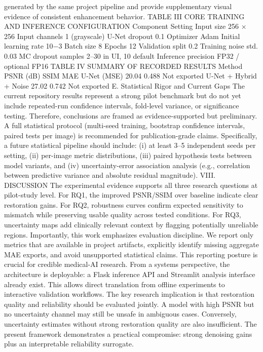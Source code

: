 generated by the same project pipeline and provide supplementary visual evidence of consistent enhancement behavior.
TABLE III
CORE TRAINING AND INFERENCE CONFIGURATION
Component Setting
Input size 256 × 256
Input channels 1 (grayscale)
U-Net dropout 0.1
Optimizer Adam
Initial learning rate 10−3
Batch size 8
Epochs 12
Validation split 0.2
Training noise std. 0.03
MC dropout samples 2–30 in UI, 10 default
Inference precision FP32 / optional FP16
TABLE IV
SUMMARY OF RECORDED RESULTS
Method PSNR (dB) SSIM MAE
U-Net (MSE) 20.04 0.488 Not exported
U-Net + Hybrid + Noise 27.02 0.742 Not exported
E. Statistical Rigor and Current Gaps
The current repository results represent a strong pilot benchmark but do not yet include repeated-run confidence intervals,
fold-level variance, or significance testing. Therefore, conclusions are framed as evidence-supported but preliminary. A
full statistical protocol (multi-seed training, bootstrap confidence intervals, paired tests per image) is recommended for
publication-grade claims.
Specifically, a future statistical pipeline should include: (i)
at least 3–5 independent seeds per setting, (ii) per-image metric distributions, (iii) paired hypothesis tests between model
variants, and (iv) uncertainty-error association analysis (e.g.,
correlation between predictive variance and absolute residual
magnitude).
VIII. DISCUSSION
The experimental evidence supports all three research questions at pilot-study level. For RQ1, the improved PSNR/SSIM
over baseline indicate clear restoration gains. For RQ2, robustness curves confirm expected sensitivity to mismatch while
preserving usable quality across tested conditions. For RQ3,
uncertainty maps add clinically relevant context by flagging
potentially unreliable regions.
Importantly, this work emphasizes evaluation discipline.
We report only metrics that are available in project artifacts,
explicitly identify missing aggregate MAE exports, and avoid
unsupported statistical claims. This reporting posture is crucial
for credible medical-AI research.
From a systems perspective, the architecture is deployable:
a Flask inference API and Streamlit analysis interface already
exist. This allows direct translation from offline experiments
to interactive validation workflows.
The key research implication is that restoration quality and
reliability should be evaluated jointly. A model with high
PSNR but no uncertainty channel may still be unsafe in
ambiguous cases. Conversely, uncertainty estimates without
strong restoration quality are also insufficient. The present
framework demonstrates a practical compromise: strong denoising gains plus an interpretable reliability surrogate.
